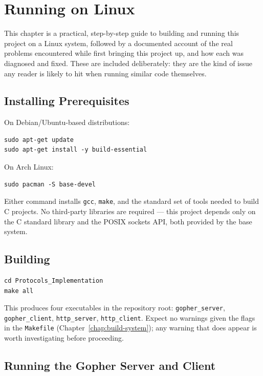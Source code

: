 \chapter{Running on Linux}
\label{chap:running-on-linux}

This chapter is a practical, step-by-step guide to building and running this project on a Linux system, followed by a documented account of the real problems encountered while first bringing this project up, and how each was diagnosed and fixed. These are included deliberately: they are the kind of issue any reader is likely to hit when running similar code themselves.

\section{Installing Prerequisites}

On Debian/Ubuntu-based distributions:
\begin{lstlisting}[style=bashstyle, numbers=none]
sudo apt-get update
sudo apt-get install -y build-essential
\end{lstlisting}

On Arch Linux:
\begin{lstlisting}[style=bashstyle, numbers=none]
sudo pacman -S base-devel
\end{lstlisting}

Either command installs \texttt{gcc}, \texttt{make}, and the standard set of tools needed to build C projects. No third-party libraries are required --- this project depends only on the C standard library and the POSIX sockets API, both provided by the base system.

\section{Building}

\begin{lstlisting}[style=bashstyle, numbers=none]
cd Protocols_Implementation
make all
\end{lstlisting}

This produces four executables in the repository root: \texttt{gopher\_server}, \texttt{gopher\_client}, \texttt{http\_server}, \texttt{http\_client}. Expect no warnings given the  flags in the \texttt{Makefile} (Chapter~\ref{chap:build-system}); any warning that does appear is worth investigating before proceeding.

\section{Running the Gopher Server and Client}

